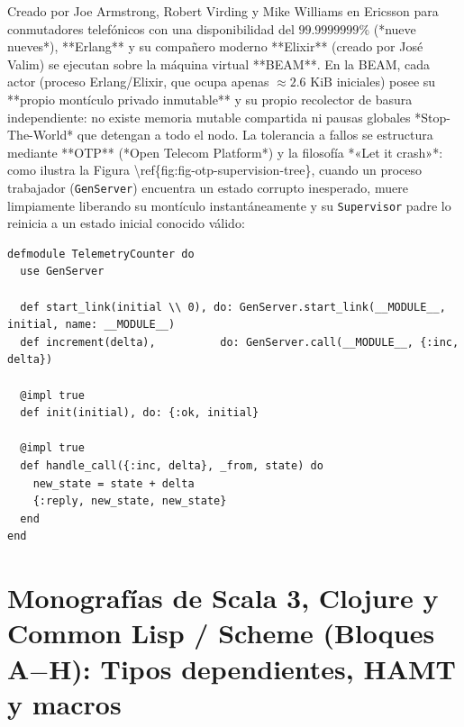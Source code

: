 \documentclass{book}
\begin{document}
Creado por Joe Armstrong, Robert Virding y Mike Williams en Ericsson para conmutadores telefónicos con una disponibilidad del \(99.9999999\%\) (*nueve nueves*), **Erlang** y su compañero moderno **Elixir** (creado por José Valim) se ejecutan sobre la máquina virtual **BEAM**. En la BEAM, cada actor (proceso Erlang/Elixir, que ocupa apenas \(\approx 2.6\text{ KiB}\) iniciales) posee su **propio montículo privado inmutable** y su propio recolector de basura independiente: no existe memoria mutable compartida ni pausas globales *Stop-The-World* que detengan a todo el nodo. La tolerancia a fallos se estructura mediante **OTP** (*Open Telecom Platform*) y la filosofía *«Let it crash»*: como ilustra la Figura \textbackslash{}ref\{fig:fig-otp-supervision-tree\}, cuando un proceso trabajador (\texttt{GenServer}) encuentra un estado corrupto inesperado, muere limpiamente liberando su montículo instantáneamente y su \texttt{Supervisor} padre lo reinicia a un estado inicial conocido válido:
\begin{lstlisting}[style=studium]
defmodule TelemetryCounter do
  use GenServer

  def start_link(initial \\ 0), do: GenServer.start_link(__MODULE__, initial, name: __MODULE__)
  def increment(delta),          do: GenServer.call(__MODULE__, {:inc, delta})

  @impl true
  def init(initial), do: {:ok, initial}

  @impl true
  def handle_call({:inc, delta}, _from, state) do
    new_state = state + delta
    {:reply, new_state, new_state}
  end
end
\end{lstlisting}

\section{Monografías de Scala 3, Clojure y Common Lisp / Scheme (Bloques A\(-\)H): Tipos dependientes, HAMT y macros}
\end{document}

